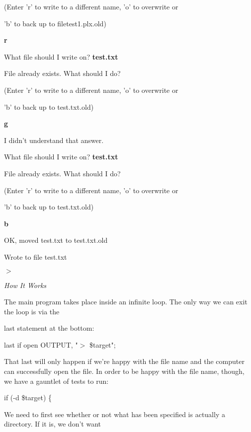 \documentclass[a4paper,11pt]{book}
\begin{document}
\noindent (Enter 'r' to write to a different name, 'o' to overwrite or

\noindent 'b' to back up to filetest1.plx.old)

\noindent \textbf{r}

\noindent What file should I write on? \textbf{test.txt}

\noindent File already exists. What should I do?

\noindent (Enter 'r' to write to a different name, 'o' to overwrite or

\noindent 'b' to back up to test.txt.old)

\noindent \textbf{g}

\noindent I didn't understand that answer.

\noindent What file should I write on? \textbf{test.txt}

\noindent File already exists. What should I do?

\noindent (Enter 'r' to write to a different name, 'o' to overwrite or

\noindent 'b' to back up to test.txt.old)

\noindent \textbf{b}

\noindent OK, moved test.txt to test.txt.old

\noindent Wrote to file test.txt

\noindent $>$

\noindent 

\noindent \textit{How It Works}

\noindent The main program takes place inside an infinite loop. The only way we can exit the loop is via the

\noindent last statement at the bottom:

\noindent 

\noindent 

\noindent last if open OUTPUT, "$>$ \$target";

\noindent 

\noindent That last will only happen if we're happy with the file name and the computer can successfully open the file. In order to be happy with the file name, though, we have a gauntlet of tests to run:

\noindent 

\noindent 

\noindent if (-d \$target) \{

\noindent 

\noindent We need to first see whether or not what has been specified is actually a directory. If it is, we don't want
\end{document}
